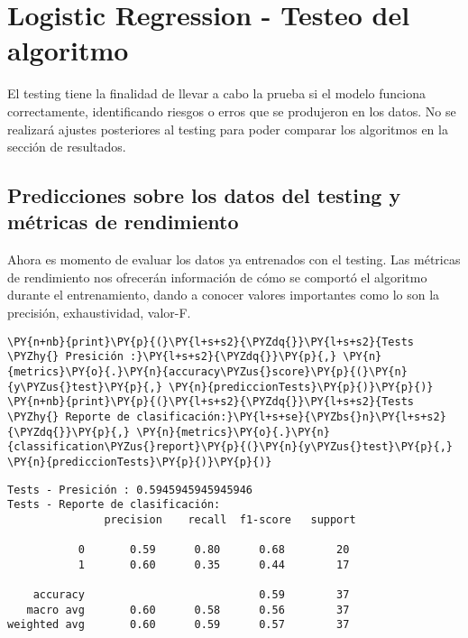     \hypertarget{logistic-regression---testeo-del-algoritmo}{%
\section{Logistic Regression - Testeo del
algoritmo}\label{logistic-regression---testeo-del-algoritmo}}

El testing tiene la finalidad de llevar a cabo la prueba si el modelo
funciona correctamente, identificando riesgos o erros que se produjeron
en los datos. No se realizará ajustes posteriores al testing para poder
comparar los algoritmos en la sección de resultados.

    \hypertarget{predicciones-sobre-los-datos-del-testing-y-muxe9tricas-de-rendimiento}{%
\subsection{Predicciones sobre los datos del testing y métricas de
rendimiento}\label{predicciones-sobre-los-datos-del-testing-y-muxe9tricas-de-rendimiento}}

Ahora es momento de evaluar los datos ya entrenados con el testing. Las
métricas de rendimiento nos ofrecerán información de cómo se comportó el
algoritmo durante el entrenamiento, dando a conocer valores importantes
como lo son la precisión, exhaustividad, valor-F.

    \begin{tcolorbox}[breakable, size=fbox, boxrule=1pt, pad at break*=1mm,colback=cellbackground, colframe=cellborder]
\begin{Verbatim}[commandchars=\\\{\}]
\PY{n+nb}{print}\PY{p}{(}\PY{l+s+s2}{\PYZdq{}}\PY{l+s+s2}{Tests \PYZhy{} Presición :}\PY{l+s+s2}{\PYZdq{}}\PY{p}{,} \PY{n}{metrics}\PY{o}{.}\PY{n}{accuracy\PYZus{}score}\PY{p}{(}\PY{n}{y\PYZus{}test}\PY{p}{,} \PY{n}{prediccionTests}\PY{p}{)}\PY{p}{)}
\PY{n+nb}{print}\PY{p}{(}\PY{l+s+s2}{\PYZdq{}}\PY{l+s+s2}{Tests \PYZhy{} Reporte de clasificación:}\PY{l+s+se}{\PYZbs{}n}\PY{l+s+s2}{\PYZdq{}}\PY{p}{,} \PY{n}{metrics}\PY{o}{.}\PY{n}{classification\PYZus{}report}\PY{p}{(}\PY{n}{y\PYZus{}test}\PY{p}{,} \PY{n}{prediccionTests}\PY{p}{)}\PY{p}{)}
\end{Verbatim}
\end{tcolorbox}

    \begin{Verbatim}[commandchars=\\\{\}]
Tests - Presición : 0.5945945945945946
Tests - Reporte de clasificación:
               precision    recall  f1-score   support

           0       0.59      0.80      0.68        20
           1       0.60      0.35      0.44        17

    accuracy                           0.59        37
   macro avg       0.60      0.58      0.56        37
weighted avg       0.60      0.59      0.57        37

    \end{Verbatim}


